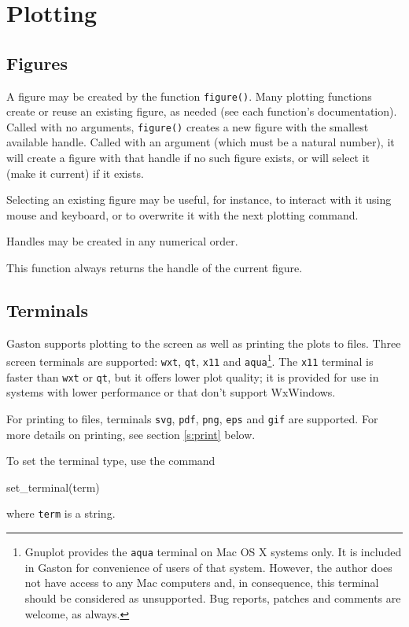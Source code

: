 \documentclass[11pt]{article}
\newcommand{\cmd}[1]{\texttt{#1}}
\begin{document}
\section{Plotting}
\label{hilevel}

\subsection{Figures}

A figure may be created by the function \cmd{figure()}. Many plotting functions
create or reuse an existing figure, as needed (see each function's
documentation). Called with no arguments, \cmd{figure()} creates a new figure
with the smallest available handle. Called with an argument (which must be a
natural number), it will create a figure with that handle if no such figure
exists, or will select it (make it current) if it exists.

Selecting an existing figure may be useful, for instance, to interact with it
using mouse and keyboard, or to overwrite it with the next plotting command.

Handles may be created in any numerical order.

This function always returns the handle of the current figure.

\subsection{Terminals}

Gaston supports plotting to the screen as well as printing the plots to files.
Three screen terminals are supported: \cmd{wxt}, \cmd{qt}, \cmd{x11} and
\cmd{aqua}\footnote{Gnuplot provides the \cmd{aqua} terminal on Mac OS X
systems only. It is included in Gaston for convenience of users of that system.
However, the author does not have access to any Mac computers and, in
consequence, this terminal should be considered as unsupported. Bug reports,
patches and comments are welcome, as always.}. The \cmd{x11} terminal is faster
than \cmd{wxt} or \cmd{qt}, but it offers lower plot quality; it is provided for
use in systems with lower performance or that don't support WxWindows.

For printing to files, terminals \cmd{svg}, \cmd{pdf}, \cmd{png}, \cmd{eps} and
\cmd{gif} are supported. For more details on printing, see section
\ref{s:print} below.

To set the terminal type, use the command
\begin{juliacode}
set_terminal(term)
\end{juliacode}
where \cmd{term} is a string.
\end{document}
